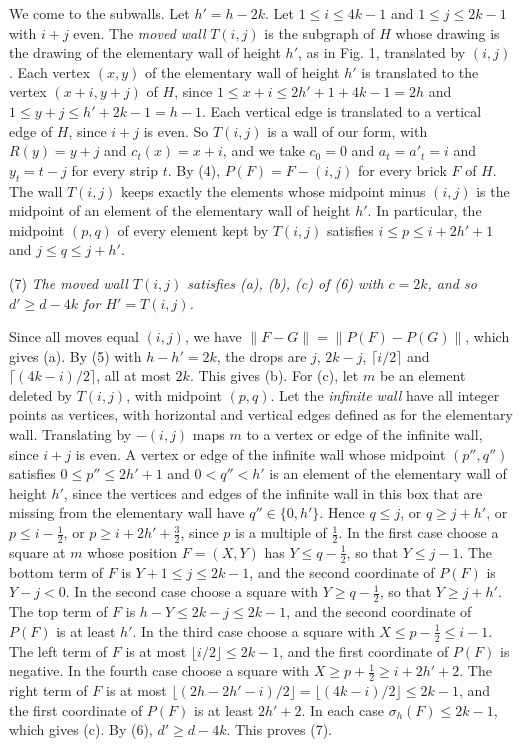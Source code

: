 {We come to the subwalls. Let $h' = h - 2k$. Let $1 \le i \le 4k - 1$ and $1 \le j \le 2k - 1$ with $i + j$ even. The \textit{moved wall} $T(i, j)$ is the subgraph of $H$ whose drawing is the drawing of the elementary wall of height $h'$, as in Fig. 1, translated by $(i, j)$. Each vertex $(x, y)$ of the elementary wall of height $h'$ is translated to the vertex $(x + i, y + j)$ of $H$, since $1 \le x + i \le 2h' + 1 + 4k - 1 = 2h$ and $1 \le y + j \le h' + 2k - 1 = h - 1$. Each vertical edge is translated to a vertical edge of $H$, since $i + j$ is even. So $T(i, j)$ is a wall of our form, with $R(y) = y + j$ and $c_t(x) = x + i$, and we take $c_0 = 0$ and $a_t = a'_t = i$ and $y_t = t - j$ for every strip $t$. By (4), $P(F) = F - (i, j)$ for every brick $F$ of $H$. The wall $T(i, j)$ keeps exactly the elements whose midpoint minus $(i, j)$ is the midpoint of an element of the elementary wall of height $h'$. In particular, the midpoint $(p, q)$ of every element kept by $T(i, j)$ satisfies $i \le p \le i + 2h' + 1$ and $j \le q \le j + h'$.

\hspace*{12pt}(7) \textit{The moved wall $T(i, j)$ satisfies (a), (b), (c) of (6) with $c = 2k$, and so $d' \ge d - 4k$ for $H' = T(i, j)$.}

Since all moves equal $(i, j)$, we have $\|F - G\| = \|P(F) - P(G)\|$, which gives (a). By (5) with $h - h' = 2k$, the drops are $j$, $2k - j$, $\lceil i/2 \rceil$ and $\lceil (4k - i)/2 \rceil$, all at most $2k$. This gives (b). For (c), let $m$ be an element deleted by $T(i, j)$, with midpoint $(p, q)$. Let the \textit{infinite wall} have all integer points as vertices, with horizontal and vertical edges defined as for the elementary wall. Translating by $-(i, j)$ maps $m$ to a vertex or edge of the infinite wall, since $i + j$ is even. A vertex or edge of the infinite wall whose midpoint $(p'', q'')$ satisfies $0 \le p'' \le 2h' + 1$ and $0 < q'' < h'$ is an element of the elementary wall of height $h'$, since the vertices and edges of the infinite wall in this box that are missing from the elementary wall have $q'' \in \{0, h'\}$. Hence $q \le j$, or $q \ge j + h'$, or $p \le i - \frac{1}{2}$, or $p \ge i + 2h' + \frac{3}{2}$, since $p$ is a multiple of $\frac{1}{2}$. In the first case choose a square at $m$ whose position $F = (X, Y)$ has $Y \le q - \frac{1}{2}$, so that $Y \le j - 1$. The bottom term of $F$ is $Y + 1 \le j \le 2k - 1$, and the second coordinate of $P(F)$ is $Y - j < 0$. In the second case choose a square with $Y \ge q - \frac{1}{2}$, so that $Y \ge j + h'$. The top term of $F$ is $h - Y \le 2k - j \le 2k - 1$, and the second coordinate of $P(F)$ is at least $h'$. In the third case choose a square with $X \le p - \frac{1}{2} \le i - 1$. The left term of $F$ is at most $\lfloor i/2 \rfloor \le 2k - 1$, and the first coordinate of $P(F)$ is negative. In the fourth case choose a square with $X \ge p + \frac{1}{2} \ge i + 2h' + 2$. The right term of $F$ is at most $\lfloor (2h - 2h' - i)/2 \rfloor = \lfloor (4k - i)/2 \rfloor \le 2k - 1$, and the first coordinate of $P(F)$ is at least $2h' + 2$. In each case $\sigma_h(F) \le 2k - 1$, which gives (c). By (6), $d' \ge d - 4k$. This proves (7).

}
